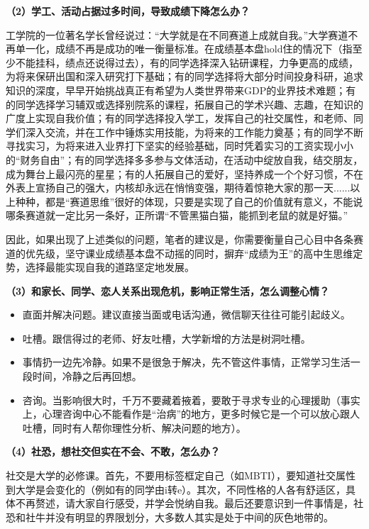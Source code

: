 \documentclass[11pt,oneside]{book}
\begin{document}
\textbf{（2）学工、活动占据过多时间，导致成绩下降怎么办？}

工学院的一位著名学长曾经说过：“大学就是在不同赛道上成就自我。”大学赛道不再单一化，成绩不再是成功的唯一衡量标准。在成绩基本盘hold住的情况下（指至少不能挂科，绩点还说得过去），有的同学选择深入钻研课程，力争更高的成绩，为将来保研出国和深入研究打下基础；有的同学选择将大部分时间投身科研，追求知识的深度，早早开始挑战真正有希望为人类世界带来GDP的业界技术难题；有的同学选择学习辅双或选择别院系的课程，拓展自己的学术兴趣、志趣，在知识的广度上实现自我价值；有的同学选择投入学工，发挥自己的社交属性，和老师、同学们深入交流，并在工作中锤炼实用技能，为将来的工作能力奠基；有的同学不断寻找实习，为将来进入业界打下坚实的经验基础，同时凭着实习的工资实现小小的“财务自由”；有的同学选择多多参与文体活动，在活动中绽放自我，结交朋友，成为舞台上最闪亮的星星；有的人拓展自己的爱好，坚持养成一个个好习惯，不在外表上宣扬自己的强大，内核却永远在悄悄变强，期待着惊艳大家的那一天......以上种种，都是“赛道思维”很好的体现，只要是实现了自己的价值就有意义，不能说哪条赛道就一定比另一条好，正所谓“不管黑猫白猫，能抓到老鼠的就是好猫。”

因此，如果出现了上述类似的问题，笔者的建议是，你需要衡量自己心目中各条赛道的优先级，坚守课业成绩基本盘不动摇的同时，摒弃“成绩为王”的高中生思维定势，选择最能实现自我的道路坚定地发展。

\textbf{（3）和家长、同学、恋人关系出现危机，影响正常生活，怎么调整心情？}

\begin{itemize}
    \item 直面并解决问题。建议直接当面或电话沟通，微信聊天往往可能引起歧义。
    \item 吐槽。跟信得过的老师、好友吐槽，大学新增的方法是树洞吐槽。
    \item 事情扔一边先冷静。如果不是很急于解决，先不管这件事情，正常学习生活一段时间，冷静之后再回想。
    \item 咨询。当影响很大时，千万不要藏着掖着，要敢于寻求专业的心理援助（事实上，心理咨询中心不能看作是“治病”的地方，更多时候它是一个可以放心跟人吐槽，同时有人帮你理性分析、解决问题的地方）。
\end{itemize}

\textbf{（4）社恐，想社交但实在不会、不敢，怎么办？}

社交是大学的必修课。首先，不要用标签框定自己（如MBTI），要知道社交属性到大学是会变化的（例如有的同学由i转e）。其次，不同性格的人各有舒适区，具体不再赘述，请大家自行感受，并学会悦纳自我。最后还要意识到一件事情是，社恐和社牛并没有明显的界限划分，大多数人其实是处于中间的灰色地带的。
\end{document}
